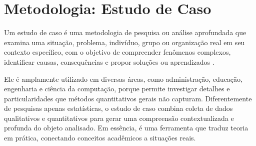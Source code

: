 \chapter{Metodologia: Estudo de Caso}
\label{ape:metodologia_estudo_caso}

Um estudo de caso é uma metodologia de pesquisa ou análise aprofundada que examina uma situação, problema, indivíduo, grupo ou organização real em seu contexto específico, com o objetivo de compreender fenômenos complexos, identificar causas, consequências e propor soluções ou aprendizados \cite{yin2015}.

Ele é amplamente utilizado em diversas áreas, como administração, educação, engenharia e ciência da computação, porque permite investigar detalhes e particularidades que métodos quantitativos gerais não capturam. Diferentemente de pesquisas apenas estatísticas, o estudo de caso combina coleta de dados qualitativos e quantitativos para gerar uma compreensão contextualizada e profunda do objeto analisado. Em essência, é uma ferramenta que traduz teoria em prática, conectando conceitos acadêmicos a situações reais.